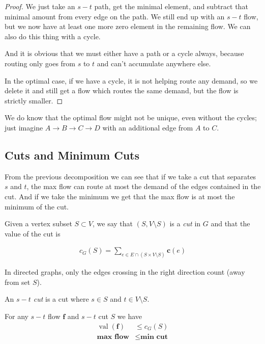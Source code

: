 \begin{proof}
    We just take an $s-t$ path, get the minimal element, and subtract that minimal amount from every edge on the path. We still end up with an $s-t$ flow, but we now have at least one more zero element in the remaining flow. We can also do this thing with a cycle.

    And it is obvious that we must either have a path or a cycle always, because routing only goes from $s$ to $t$ and can't accumulate anywhere else.

    In the optimal case, if we have a cycle, it is not helping route any demand, so we delete it and still get a flow which routes the same demand, but the flow is strictly smaller.
\end{proof}

We do know that the optimal flow might not be unique, even without the cycles; just imagine $A \rightarrow B \rightarrow C \rightarrow D$ with an additional edge from $A$ to $C$.


\subsection{Cuts and Minimum Cuts}

From the previous decomposition we can see that if we take a cut that separates $s$ and $t$, the max flow can route at most the demand of the edges contained in the cut. And if we take the minimum we get that the max flow is at most the minimum of the cut.



\begin{definicija}
    Given a vertex subset $S \subset V$, we say that $(S, V \setminus S)$ is a \emph{cut} in $G$ and that the value of the cut is 
    
    \begin{align}
        c_G (S) = \sum_{e\in E \cap (S \times V \setminus S) } \mathbf{c}(e)
    \end{align}

    In directed graphs, only the edges crossing in the right direction count (away from set $S$).
\end{definicija}

\begin{definicija}
    An \emph{$s-t$ cut} is a cut where $s \in S$ and $t \in V\setminus S$.
\end{definicija}

\begin{izrek}
    For any $s-t$ flow $\mathbf{f}$ and $s-t$ cut $S$ we have
    \begin{align}
        \operatorname{val}(\mathbf{f}) &\leq c_G(S)\\
        \textbf{max flow} &\leq \textbf{min cut} \nonumber
    \end{align}
\end{izrek}

